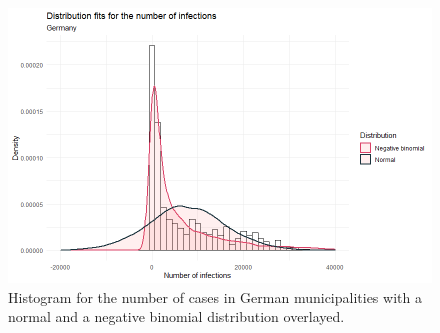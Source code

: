 \begin{figure}[H]
  \centering
  \includegraphics[width = \textwidth]{distrfit_germany_ts.png}  
  \caption{Histogram for the number of cases in German municipalities with a normal and a negative binomial distribution overlayed.}
  \label{fitDistrGermany_ts}
\end{figure}
\clearpage
